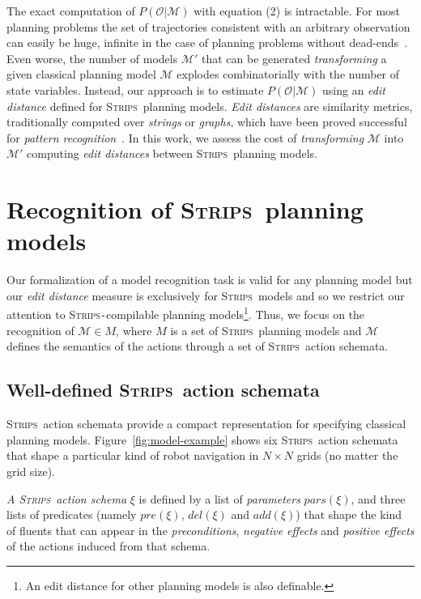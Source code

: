 \documentclass[letterpaper]{article} %
\newcommand{\strips}{\textsc{Strips}}     %
\begin{document}
The exact computation of $P(\mathcal{O}|\mathcal{M})$ with equation (2) is intractable. For most planning problems the set of trajectories consistent with an arbitrary observation can easily be huge, infinite in the case of planning problems without dead-ends~\cite{lesh1995sound}. Even worse, the number of models $\mathcal{M}'$ that can be generated {\em transforming} a given classical planning model $\mathcal{M}$ explodes combinatorially with the number of state variables. Instead, our approach is to estimate $P(\mathcal{O}|\mathcal{M})$ using an {\em edit distance} defined for \strips\ planning models. {\em Edit distances} are similarity metrics, traditionally computed over {\em strings} or {\em graphs}, which have been proved successful for {\em pattern recognition}~\cite{MasekP80,Bunke97}. In this work, we assess the cost of {\em transforming} $\mathcal{M}$ into $\mathcal{M'}$ computing {\em edit distances} between \strips\ planning models.


\section{Recognition of \strips\ planning models}
\label{sec:asPlanning}

Our formalization of a model recognition task is valid for any planning model but our \emph{edit distance} measure is exclusively for \strips\ models and so we restrict our attention to \strips\texttt{-}compilable planning models\footnote{An edit distance for other planning models is also definable.}. Thus, we focus on the recognition of $\mathcal{M}\in M$, where $M$ is a set of \strips\ planning models and $\mathcal{M}$ defines the semantics of the actions through a set of \strips\ action schemata.


\subsection{Well-defined \strips\ action schemata}
\strips\ action schemata provide a compact representation for specifying classical planning models. Figure~\ref{fig:model-example} shows six \strips\ action schemata that shape a particular kind of robot navigation in $N\times N$ grids (no matter the grid size).

{\em A \strips\ action schema} $\xi$ is defined by a list of {\em parameters} $pars(\xi)$, and three lists of predicates (namely $pre(\xi)$, $del(\xi)$ and $add(\xi)$) that shape the kind of fluents that can appear in the {\em preconditions}, {\em negative effects} and {\em positive effects} of the actions induced from that schema.
\end{document}
